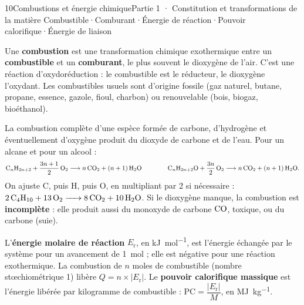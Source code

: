 \begin{ouverture}[flamme]{10}{Combustions et énergie chimique}{Partie 1 · Constitution et transformations de la matière}
{Combustible\enspace·\enspace Comburant\enspace·\enspace Énergie de réaction\enspace·\enspace Pouvoir calorifique\enspace·\enspace Énergie de liaison}
\end{ouverture}
\essentiel
{}
\begin{definition}[Combustion]
Une \textbf{combustion} est une transformation chimique exothermique entre un \textbf{combustible} et un \textbf{comburant}, le
plus souvent le dioxygène de l'air. C'est une réaction d'oxydoréduction : le combustible est le réducteur, le dioxygène
l'oxydant. Les combustibles usuels sont d'origine fossile (gaz naturel, butane, propane, essence, gazole, fioul, charbon)
ou renouvelable (bois, biogaz, bioéthanol).
\end{definition}
\begin{propriete}
La combustion complète d'une espèce formée de carbone, d'hydrogène et éventuellement d'oxygène produit du dioxyde de
carbone et de l'eau. Pour un alcane et pour un alcool :
\[\mathrm{C}_n\mathrm{H}_{2n+2}+\frac{3n+1}{2}\,\ce{O2}\longrightarrow n\,\ce{CO2}+(n+1)\,\ce{H2O}\qquad\qquad\mathrm{C}_n\mathrm{H}_{2n+2}\mathrm{O}+\frac{3n}{2}\,\ce{O2}\longrightarrow n\,\ce{CO2}+(n+1)\,\ce{H2O}.\]
On ajuste C, puis H, puis O, en multipliant par 2 si nécessaire : $\ce{2C4H10 + 13O2 -> 8CO2 + 10H2O}$. Si le dioxygène manque,
la combustion est \textbf{incomplète} : elle produit aussi du monoxyde de carbone $\ce{CO}$, toxique, ou du carbone (suie).
\end{propriete}
\begin{definition}
L'\textbf{énergie molaire de réaction} $E_\mathrm{r}$, en \unit{kJ.mol^{-1}}, est l'énergie échangée par le système pour un avancement de
\qty{1}{mol} ; elle est négative pour une réaction exothermique. La combustion de $n$ moles de combustible (nombre stœchiométrique 1)
libère $Q=n\times|E_\mathrm{r}|$. Le \textbf{pouvoir calorifique massique} est l'énergie libérée par kilogramme de combustible :
$\mathrm{PC}=\dfrac{|E_\mathrm{r}|}{M}$, en \unit{MJ.kg^{-1}}.
\end{definition}
